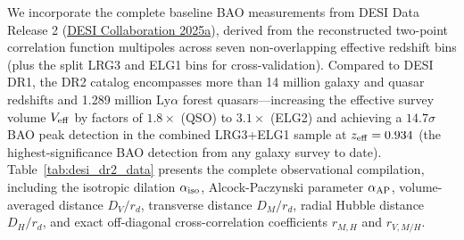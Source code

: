 \documentclass[11pt,letterpaper]{article}
\begin{document}
We incorporate the complete baseline BAO measurements from DESI Data Release 2 (\href{https://arxiv.org/abs/2503.14738}{DESI Collaboration 2025a}), derived from the reconstructed two-point correlation function multipoles across seven non-overlapping effective redshift bins (plus the split LRG3 and ELG1 bins for cross-validation). Compared to DESI DR1, the DR2 catalog encompasses more than 14 million galaxy and quasar redshifts and 1.289 million $\text{Ly}\alpha$ forest quasars---increasing the effective survey volume $V_{\rm eff}$ by factors of $1.8\times$ (QSO) to $3.1\times$ (ELG2) and achieving a $14.7\sigma$ BAO peak detection in the combined LRG3+ELG1 sample at $z_{\rm eff} = 0.934$ (the highest-significance BAO detection from any galaxy survey to date). Table~\ref{tab:desi_dr2_data} presents the complete observational compilation, including the isotropic dilation $\alpha_{\rm iso}$, Alcock-Paczynski parameter $\alpha_{\rm AP}$, volume-averaged distance $D_V/r_d$, transverse distance $D_M/r_d$, radial Hubble distance $D_H/r_d$, and exact off-diagonal cross-correlation coefficients $r_{M,H}$ and $r_{V,M/H}$.
\end{document}
